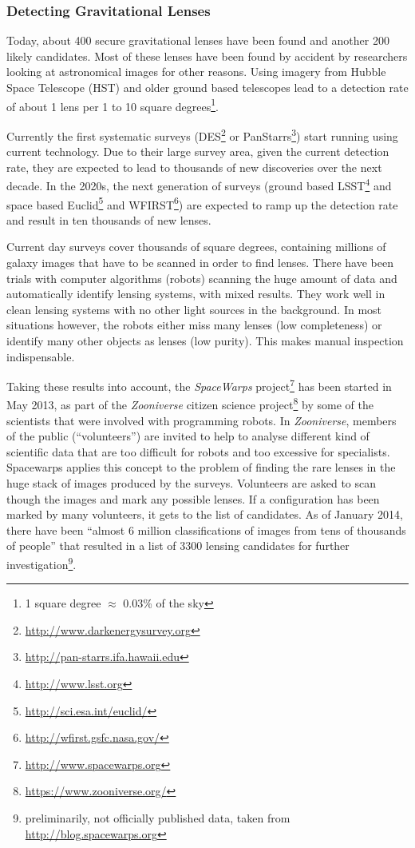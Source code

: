\documentclass[11pt]{article}
\begin{document}
\subsubsection{Detecting Gravitational Lenses}

Today, about 400 secure gravitational lenses have been found and another 200 likely candidates.
Most of these lenses have been found by accident by researchers looking at astronomical images for other reasons.
Using imagery from Hubble Space Telescope (HST) and older ground based telescopes lead to a detection rate of about 1 lens per 1 to 10 square degrees\footnote{1 square degree $\approx$ 0.03\% of the sky}.

Currently the first systematic surveys (DES\footnote{\url{http://www.darkenergysurvey.org}} or PanStarrs\footnote{\url{http://pan-starrs.ifa.hawaii.edu}}) start running using current technology.
Due to their large survey area, given the current detection rate, they are expected to lead to thousands of new discoveries over the next decade.
In the 2020s, the next generation of surveys (ground based LSST\footnote{\url{http://www.lsst.org}} and space based Euclid\footnote{\url{http://sci.esa.int/euclid/}} and WFIRST\footnote{\url{http://wfirst.gsfc.nasa.gov/}}) are expected to ramp up the detection rate and result in ten thousands of new lenses.

Current day surveys cover thousands of square degrees, containing millions of galaxy images that have to be scanned in order to find lenses.
There have been trials with computer algorithms (robots) scanning the huge amount of data and automatically identify lensing systems\cite{robots}, with mixed results.
They work well in clean lensing systems with no other light sources in the background.
In most situations however, the robots either miss many lenses (low completeness) or identify many other objects as lenses (low purity).
This makes manual inspection indispensable.

Taking these results into account, the \emph{SpaceWarps} project\footnote{\url{http://www.spacewarps.org}} has been started in May 2013, as part of the \emph{Zooniverse} citizen science project\footnote{\url{https://www.zooniverse.org/}} by some of the scientists that were involved with programming robots.
In \emph{Zooniverse}, members of the public (``volunteers'') are invited to help to analyse different kind of scientific data that are too difficult for robots and too excessive for specialists.
Spacewarps applies this concept to the problem of finding the rare lenses in the huge stack of images produced by the surveys.
Volunteers are asked to scan though the images and mark any possible lenses.
If a configuration has been marked by many volunteers, it gets to the list of candidates.
As of January 2014, there have been ``almost 6 million classifications of images from tens of thousands of people'' that resulted in a list of 3300 lensing candidates for further investigation\footnote{preliminarily, not officially published data, taken from \url{http://blog.spacewarps.org}}.
\end{document}
